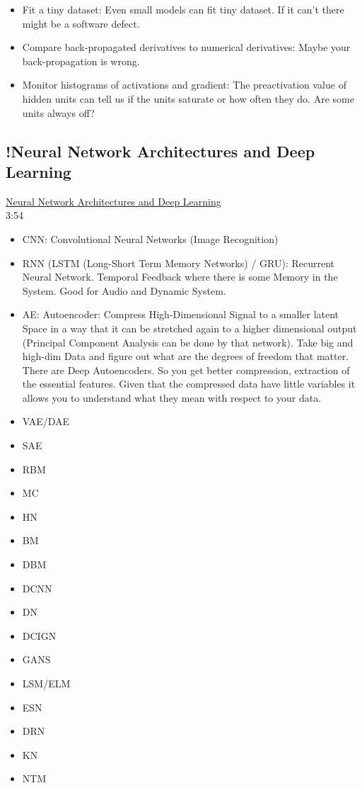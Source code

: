 \begin{itemize}
\begin{itemize}[noitemsep,nolistsep]
		\item Fit a tiny dataset: Even small models can fit tiny dataset. If it can't there might be a software defect.
		\item Compare back-propagated derivatives to numerical derivatives: Maybe your back-propagation is wrong.
		\item Monitor histograms of activations and gradient: The preactivation value of hidden units can tell us if the units saturate or how often they do. Are some units always off? 
	\end{itemize}
\end{itemize}

\subsection{!Neural Network Architectures and Deep Learning}
\href{https://www.youtube.com/watch?v=oJNHXPs0XDk}{Neural Network Architectures and Deep Learning}
\\3:54
\begin{itemize}[noitemsep,nolistsep]
	\item CNN: Convolutional Neural Networks (Image Recognition)
	\item RNN (LSTM (Long-Short Term Memory Networks) / GRU): Recurrent Neural Network. Temporal Feedback where there is some Memory in the System. Good for Audio and Dynamic System.
	\item AE: Autoencoder: Compress High-Dimensional Signal to a smaller latent Space in a way that it can be stretched again to a higher dimensional output (Principal Component Analysis can be done by that network). Take big and high-dim Data and figure out what are the degrees of freedom that matter. There are Deep Autoencoders. So you get better compression, extraction of the essential features. Given that the compressed data have little variables it allows you to understand what they mean with respect to your data.
	\item VAE/DAE
	\item SAE
	\item RBM
	\item MC
	\item HN
	\item BM
	\item DBM
	\item DCNN
	\item DN
	\item DCIGN
	\item GANS
	\item LSM/ELM
	\item ESN
	\item DRN
	\item KN
	\item NTM
\end{itemize}

